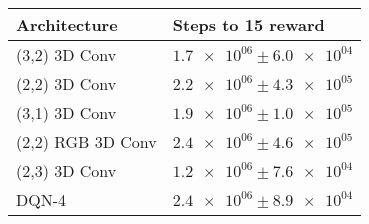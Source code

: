 \begin{tabular}{ll}
\hline
 Architecture      & Steps to 15 reward                \\
\hline
 (3,2) 3D Conv     & $\num{1.7e+06} \pm \num{6.0e+04}$ \\
 (2,2) 3D Conv     & $\num{2.2e+06} \pm \num{4.3e+05}$ \\
 (3,1) 3D Conv     & $\num{1.9e+06} \pm \num{1.0e+05}$ \\
 (2,2) RGB 3D Conv & $\num{2.4e+06} \pm \num{4.6e+05}$ \\
 (2,3) 3D Conv     & $\num{1.2e+06} \pm \num{7.6e+04}$ \\
 DQN-4             & $\num{2.4e+06} \pm \num{8.9e+04}$ \\
\hline
\end{tabular}